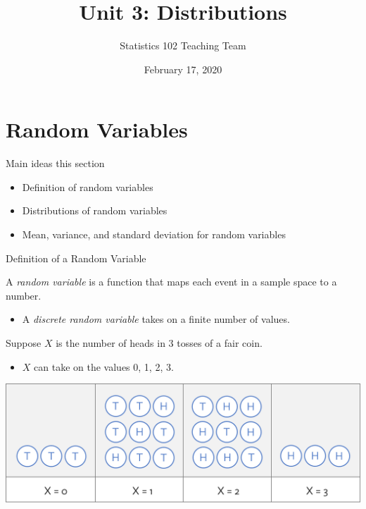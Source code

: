\documentclass[ignorenonframetext,aspectratio=169]{beamer}
\title{Unit 3: Distributions}
\author{Statistics 102 Teaching Team}
\date{February 17, 2020}
\providecommand{\tightlist}{%
  \setlength{\itemsep}{0pt}\setlength{\parskip}{0pt}}
\begin{document}
\frame{\titlepage}

\begin{frame}
\tableofcontents[hideallsubsections]
\end{frame}

\section{Random Variables}\label{random-variables}

\begin{frame}{Main ideas this section}

\begin{itemize}
\item
  Definition of random variables
\item
  Distributions of random variables
\item
  Mean, variance, and standard deviation for random variables
\end{itemize}

\end{frame}

\begin{frame}{Definition of a Random Variable}

A \emph{random variable} is a function that maps each event in a sample
space to a number.

\begin{itemize}
\tightlist
\item
  A \emph{discrete random variable} takes on a finite number of values.
\end{itemize}

Suppose \(X\) is the number of heads in 3 tosses of a fair coin.

\begin{itemize}
\tightlist
\item
  \(X\) can take on the values 0, 1, 2, 3.
\end{itemize}

\includegraphics{figures/coinToss.png}

\end{frame}
\end{document}
